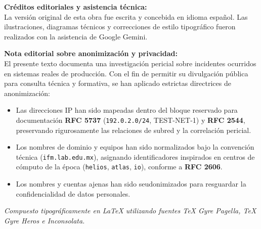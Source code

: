 {\vspace{1.0em}
\noindent
\textbf{Créditos editoriales y asistencia técnica:}\\
La versión original de esta obra fue escrita y concebida en idioma español. Las ilustraciones, diagramas técnicos y correcciones de estilo tipográfico fueron realizados con la asistencia de Google Gemini.

\vspace{1.0em}
\noindent
\textbf{Nota editorial sobre anonimización y privacidad:}\\
El presente texto documenta una investigación pericial sobre incidentes ocurridos en sistemas reales de producción. Con el fin de permitir su divulgación pública para consulta técnica y formativa, se han aplicado estrictas directrices de anonimización:
\begin{itemize}\setlength{\itemsep}{0pt}\setlength{\parskip}{0pt}
    \item Las direcciones IP han sido mapeadas dentro del bloque reservado para documentación \textbf{RFC 5737} (\texttt{192.0.2.0/24}, TEST-NET-1) y \textbf{RFC 2544}, preservando rigurosamente las relaciones de subred y la correlación pericial.
    \item Los nombres de dominio y equipos han sido normalizados bajo la convención técnica (\texttt{ifm.lab.edu.mx}), asignando identificadores inspirados en centros de cómputo de la época (\texttt{helios}, \texttt{atlas}, \texttt{io}), conforme a \textbf{RFC 2606}.
    \item Los nombres y cuentas ajenas han sido seudonimizados para resguardar la confidencialidad de datos personales.
\end{itemize}

\vspace{0.8em}
\noindent
\textit{Compuesto tipográficamente en \LaTeX{} utilizando fuentes TeX Gyre Pagella, TeX Gyre Heros e Inconsolata.}
}
\newpage
